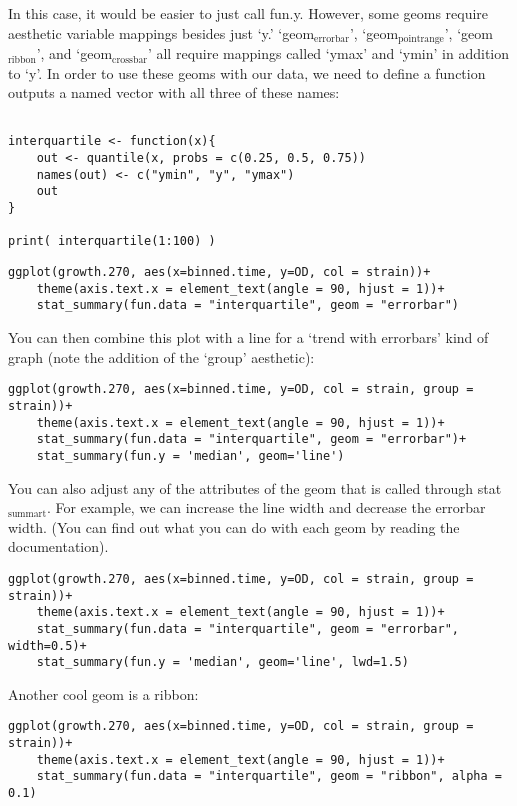 \documentclass[11pt]{article}
\begin{document}
In this case, it would be easier to just call
fun.y. However, some geoms require aesthetic variable mappings besides
just `y.' `geom$_{\mathrm{errorbar}}$', `geom$_{\mathrm{pointrange}}$', `geom$_{\mathrm{ribbon}}$', and `geom$_{\mathrm{crossbar}}$' all
require mappings called `ymax' and `ymin' in addition to `y'. In order
to use these geoms with our data, we need to define a function outputs
a named vector with all three of these names:

\begin{verbatim}

interquartile <- function(x){
    out <- quantile(x, probs = c(0.25, 0.5, 0.75))
    names(out) <- c("ymin", "y", "ymax")
    out
}

print( interquartile(1:100) )
\end{verbatim}


\begin{verbatim}
ggplot(growth.270, aes(x=binned.time, y=OD, col = strain))+
    theme(axis.text.x = element_text(angle = 90, hjust = 1))+
    stat_summary(fun.data = "interquartile", geom = "errorbar")
\end{verbatim}


You can then combine this plot with a line for a `trend with
errorbars' kind of graph (note the addition of the `group' aesthetic):

\begin{verbatim}
ggplot(growth.270, aes(x=binned.time, y=OD, col = strain, group = strain))+
    theme(axis.text.x = element_text(angle = 90, hjust = 1))+
    stat_summary(fun.data = "interquartile", geom = "errorbar")+
    stat_summary(fun.y = 'median', geom='line')
\end{verbatim}


You can also adjust any of the attributes of the geom that is
called through stat$_{\mathrm{summart}}$. For example, we can increase the line width and decrease the
errorbar width. (You can find out what you can do with each geom by
reading the documentation).

\begin{verbatim}
ggplot(growth.270, aes(x=binned.time, y=OD, col = strain, group = strain))+
    theme(axis.text.x = element_text(angle = 90, hjust = 1))+
    stat_summary(fun.data = "interquartile", geom = "errorbar", width=0.5)+
    stat_summary(fun.y = 'median', geom='line', lwd=1.5)
\end{verbatim}


Another cool geom is a ribbon:

\begin{verbatim}
ggplot(growth.270, aes(x=binned.time, y=OD, col = strain, group = strain))+
    theme(axis.text.x = element_text(angle = 90, hjust = 1))+
    stat_summary(fun.data = "interquartile", geom = "ribbon", alpha = 0.1)
\end{verbatim}
\end{document}
